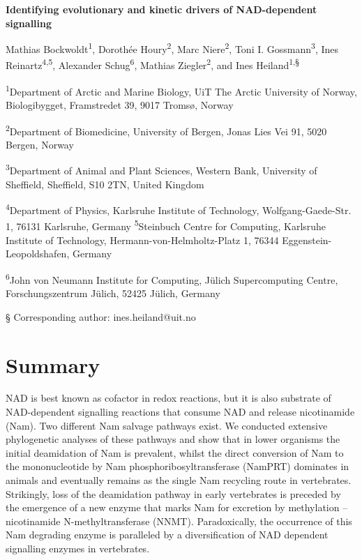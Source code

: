 
\noindent
{\huge\sffamily\bfseries Identifying evolutionary and kinetic drivers of NAD-dependent signalling \par}

\vspace{5mm}

\noindent
Mathias Bockwoldt\textsuperscript{1}, Dorothée Houry\textsuperscript{2}, Marc Niere\textsuperscript{2}, Toni I. Gossmann\textsuperscript{3}, Ines Reinartz\textsuperscript{4,5}, Alexander Schug\textsuperscript{6}, Mathias Ziegler\textsuperscript{2}, and Ines Heiland\textsuperscript{1,§}

\vspace{1cm}

\noindent
\textsuperscript{1}Department of Arctic and Marine Biology, UiT The Arctic University of Norway, Biologibygget, Framstredet 39, 9017 Tromsø, Norway

\noindent
\textsuperscript{2}Department of Biomedicine, University of Bergen, Jonas Lies Vei 91, 5020 Bergen, Norway

\noindent
\textsuperscript{3}Department of Animal and Plant Sciences, Western Bank, University of Sheffield, Sheffield, S10 2TN, United Kingdom

\noindent
\textsuperscript{4}Department of Physics, Karlsruhe Institute of Technology, Wolfgang-Gaede-Str. 1, 76131 Karlsruhe, Germany
\textsuperscript{5}Steinbuch Centre for Computing, Karlsruhe Institute of Technology, Hermann-von-Helmholtz-Platz 1, 76344 Eggenstein-Leopoldshafen, Germany

\noindent
\textsuperscript{6}John von Neumann Institute for Computing, Jülich Supercomputing Centre, Forschungszentrum Jülich, 52425 Jülich, Germany

\noindent
§ Corresponding author: ines.heiland@uit.no


\section*{Summary}

NAD is best known as cofactor in redox reactions, but it is also substrate of NAD-dependent signalling reactions that consume NAD and release nicotinamide (Nam). Two different Nam salvage pathways exist. We conducted extensive phylogenetic analyses of these pathways and show that in lower organisms the initial deamidation of Nam is prevalent, whilst the direct conversion of Nam to the mononucleotide by Nam phosphoribosyltransferase (NamPRT) dominates in animals and eventually remains as the single Nam recycling route in vertebrates. Strikingly, loss of the deamidation pathway in early vertebrates is preceded by the emergence of a new enzyme that marks Nam for excretion by methylation – nicotinamide N-methyltransferase (NNMT). Paradoxically, the occurrence of this Nam degrading enzyme is paralleled by a diversification of NAD dependent signalling enzymes in vertebrates.

